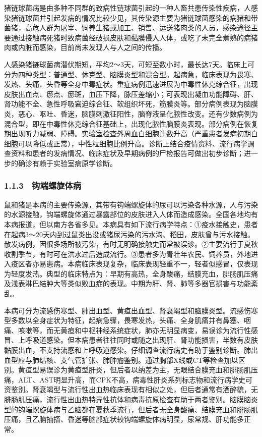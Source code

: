 猪链球菌病是由多种不同群的致病性链球菌引起的一种人畜共患传染性疾病，人感染猪链球菌并引起发病的情况比较少见，其传染源主要为猪链球菌感染的病猪和带菌猪，高危人群为屠宰、饲养生猪或加工、销售、运送猪肉类的人员，感染途径主要通过接触病死猪时致病菌经破损皮肤和黏膜侵入人体，或吃了未完全煮熟的病猪肉或内脏而感染，目前尚未发现人与人之间的传播。

人感染猪链球菌病潜伏期短，平均2～3天，可短至数小时，最长达7天。临床上可分为四种类型：普通型、休克型、脑膜炎型和混合型。起病急，临床表现为畏寒、发热、头痛、头昏等全身中毒症状。重症病例迅速进展为中毒性休克综合征，出现皮肤出血点、瘀点、瘀斑，血压下降，脉压差缩小；可表现出凝血功能障碍、肝、肾功能不全、急性呼吸窘迫综合征、软组织坏死，筋膜炎等。部分病例表现为脑膜炎，恶心、呕吐、昏迷，脑膜刺激征阳性，脑脊液呈化脓性改变。还有少数病例为混合型，即在中毒性休克综合征基础上，出现化脓性脑膜炎表现。部分病例在恢复期出现听力减弱、障碍。实验室检查外周血白细胞计数升高（严重患者发病初期白细胞可以降低或正常），中性粒细胞比例升高。诊断上结合疫情资料、流行病学调查资料和患者的发病情况、临床症状及早期病例的尸检报告可做出初步诊断；进一步的确诊有赖于实验室病原学诊断。

\protect\hypertarget{text00015.html}{}{}

\subsubsection{1.1.3　钩端螺旋体病}

鼠和猪是本病的主要传染源，其带有钩端螺旋体的尿可以污染各种水源，人与污染的水源接触，钩端螺旋体通过暴露部位的皮肤进入人体而造成感染。全国各地均有本病报道，但以南方各省多见。本病具有如下流行病学特点：①疫水接触史，患者在起病3～20天内到过鼠类出没或猪尿污染的污水沟、稻田，皮肤曾与污水接触。散发病例，因很多场所被污染，有时无明确接触史而常被误诊。②主要流行于夏秋收割季节，有时可在洪水过后造成流行。③患者多为青壮年农民、饲养员，外地进入疫区者亦易患病。本病临床表现复杂，临床表现轻重不一，轻者似感冒，仅表现为轻度发热。典型的临床特点为：早期有高热，全身酸痛，结膜充血，腓肠肌压痛及浅表淋巴结肿大等类似败血症的表现。中期为肝、肾、肺等多器官损害与功能紊乱。

本病可分为流感伤寒型、肺出血型、黄疸出血型、肾衰竭型和脑膜炎型。流感伤寒型多数以全身症状为特征，起病急骤，畏寒发热，头痛、全身肌痛并有鼻塞、咽痛、咳嗽等，而无黄疸和中枢神经系统症状，肺亦无明显病变，易误诊为流行性感冒、上呼吸道感染。但本病患者往往同时或随之出现肝、肾功能损害，半数有皮肤黏膜出血，不支持流感和上呼吸道感染。仔细调查流行病史有助于鉴别诊断。肺出血型应与肺结核、支气管扩张、肺肿瘤鉴别。通过胸部X线或CT等检查加以区别。黄疸型易误诊为黄疸型肝炎，但后者以纳差为主，无眼结合膜充血和腓肠肌压痛，ALT、AST明显升高，而CPK不高，病毒性肝炎系列标志物和流行病学史可资鉴别。肾衰竭型与流行性出血热临床表现有相似之处，但后者通常有酒醉貌，无腓肠肌压痛，流行性出血热特异性抗体和病毒抗原检查有助于两者鉴别。脑膜脑炎型的钩端螺旋体病与乙脑都在夏秋季流行，但后者无全身酸痛、结膜充血和腓肠肌压痛，且乙脑抽搐、昏迷等脑部症状较钩端螺旋体病明显，尿常规、肝功能多正常。

